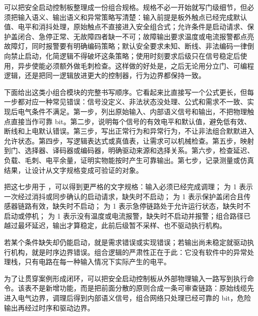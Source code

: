 可以把安全启动控制板整理成一份组合规格。规格不必一开始就写门级细节，但必须把输入语义、输出语义和异常策略写清楚：输入前提是板外触点已经完成默认值、电平和消抖处理，原始触点不直接进入安全组合式；允许条件是启动请求、保护盖闭合、急停正常、无故障四者缺一不可；故障输出要求温度或电流报警都点亮故障灯，同时报警要有明确编码策略；默认安全要求未知、断线、非法编码一律倒向禁止启动，化简逻辑不得破坏这条策略；使用时刻要求后级只在信号稳定后使用，异步使能必须额外做毛刺检查。这样做的好处是，之后无论用分立门、可编程逻辑，还是把同一逻辑放进更大的控制器，行为边界都保持一致。

下面给出这类小组合模块的完整书写顺序。它看起来比直接写一个公式更长，但每一步都对应一种常见错误：信号没定义、非法状态没处理、公式和需求不一致、实现后电气条件不满足。第一步，列出原始输入、内部语义信号和输出，不把物理触点直接当作可靠 bit。第二步，说明每个信号的有效电平和默认值，避免低有效、断线和上电默认错误。第三步，写出正常行为和异常行为，不让非法组合默默进入允许状态。第四步，写逻辑表达式或真值表，让需求可以机械检查。第五步，映射到门、选择器、译码器或编码器，明确驱动来源和选择关系。第六步，检查延迟、负载、毛刺、电平余量，证明实物能按时产生可靠输出。第七步，记录测量或仿真结果，让设计从文字规格变成可验证的对象。

把这七步用于 ，可以得到更严格的文字规格：输入必须已经完成调理； 为 1 表示一次经过消抖或同步确认的启动请求，缺失时不启动； 为 1 表示保护盖闭合且传感器链路有效，缺失时不启动； 为 1 表示急停链路处于允许运行状态，缺失时不启动或停机； 为 1 表示没有温度或电流报警，缺失时不启动并报警；组合路径已越过最坏延迟，输出才算稳定，此前后级暂不采样、也不驱动执行机构。

若某个条件缺失却仍能启动，就是需求错误或实现错误；若输出尚未稳定就驱动执行机构，就是时序边界错误。组合逻辑的严肃性正在于此：它没有软件中的异常处理栈，只有电路在每一种输入情况下实际产生的电平。

为了让贯穿案例形成闭环，可以把安全启动控制板从外部物理输入一路写到执行命令。该表不是新增功能，而是把前面分散的原则合成一条可审查链路：原始线缆先进入电气边界，调理后得到内部语义信号，组合网络只处理已经可靠的 bit，危险输出再经过时序和驱动边界。

